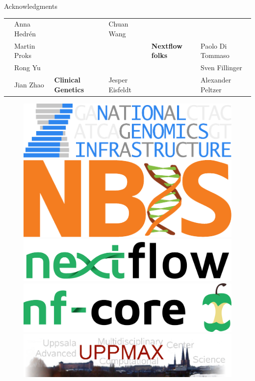\documentclass[usepdftitle=false]{beamer}
\begin{document}
\begin{frame}{Acknowledgments}
\begin{table}
{\begin{tabular}{llllll}
													&	Anna Hedrén					&														&	Chuan Wang									&															&	\\
													&	Martin Proks				&									&							&	\textbf{Nextflow folks}	&	Paolo Di Tommaso	\\
													&	Rong Yu							&									&							&													&	Sven Fillinger	\\
													&	Jian Zhao						&	\textbf{Clinical Genetics}		&	Jesper Eisfeldt			&		&	Alexander Peltzer	\\
		\end{tabular}}
	\end{table}
	\begin{figure}
		\includegraphics[height=.5cm]{pictures/NGI}%
		\hfill%
		\includegraphics[height=.5cm]{pictures/NBIS-orange}%
		\hfill%
		\includegraphics[height=.5cm]{pictures/nextflow.png}%
		\hfill%
		\includegraphics[height=.5cm]{pictures/nf-core}%
		\hfill%
		\includegraphics[height=.5cm]{pictures/uppmax.png}%
	\end{figure}
\end{frame}
\end{document}
